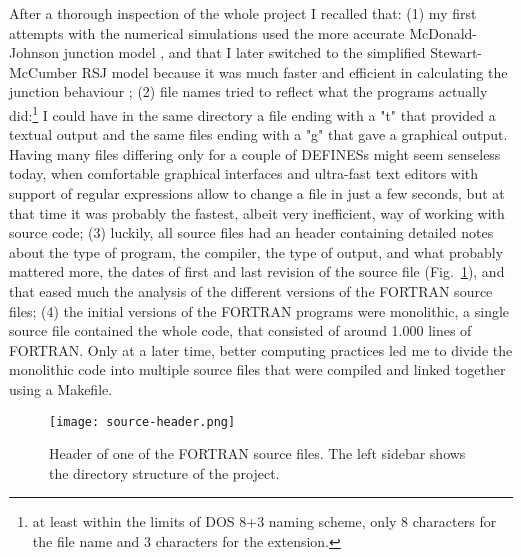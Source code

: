 
After a thorough inspection of the whole project I recalled that: 
(1) my first attempts with the numerical simulations used the more accurate McDonald-Johnson junction model \cite{McDonald:1976}, and that I later switched to the simplified Stewart-McCumber RSJ model because it was much faster and efficient in calculating the junction behaviour \cite{McCumber:1968, Stewart:1974}; 
(2) file names tried to reflect what the programs actually did:\footnote{at least within the limits of DOS 8+3 naming scheme, only 8 characters for the file name and 3 characters for the extension.} 
I could have in the same directory a file ending with a "t" that provided a textual output and the same files ending with a "g" that gave a graphical output. Having many files differing only for a couple of \textsf{DEFINES}s might seem senseless today, when comfortable graphical interfaces and ultra-fast text editors with support of regular expressions allow to change a file in just a few seconds, but at that time it was probably the fastest, albeit very inefficient, way of working with source code;
(3) luckily, all source files had an header containing detailed notes about the type of program, the compiler, the type of output, and what probably mattered more, the dates of first and last revision of the source file (Fig.~\ref{fig:source-header}), and that eased much the analysis of the different versions of the FORTRAN source files; 
(4) the initial versions of the FORTRAN programs were monolithic, a single source file contained the whole code, that consisted of around 1.000 lines of FORTRAN. Only at a later time, better computing practices led me to divide the monolithic code into multiple source files that were compiled and linked together using a \textsf{Makefile}.

\begin{figure}[tb]
	\centering
	\texttt{[image: source-header.png]}
	\caption{Header of one of the FORTRAN source files. The left sidebar shows the directory structure of the project.}
	\label{fig:source-header}
\end{figure}



